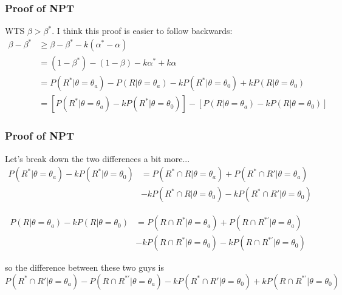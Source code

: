\documentclass{beamer}
\begin{document}
\begin{frame}
\frametitle{Proof of NPT}

WTS $\beta > \beta^*$. I think this proof is easier to follow backwards:
\begin{align*}
\beta - \beta^* &\ge \beta - \beta^* - k(\alpha^* - \alpha) \\ 
&= (1-\beta^*) - (1-\beta) - k\alpha^* + k\alpha \\ 
&= P(R^*| \theta = \theta_a) - P(R| \theta = \theta_a) - kP(R^* | \theta = \theta_0) + kP(R | \theta = \theta_0) \\ 
&= \left[ P(R^*| \theta = \theta_a) - kP(R^* | \theta = \theta_0)\right] 
      - \left[P(R| \theta = \theta_a)  - kP(R | \theta = \theta_0) \right] 
\end{align*}


\end{frame}


\begin{frame}
\frametitle{Proof of NPT}

Let's break down the two differences a bit more...
\begin{align*}
 P(R^*| \theta = \theta_a) - kP(R^* | \theta = \theta_0) &=  P(R^* \cap R| \theta = \theta_a) + P(R^* \cap R'| \theta = \theta_a)\\
&- kP(R^* \cap R | \theta = \theta_0) - kP(R^* \cap R' | \theta = \theta_0)
\end{align*}


\begin{align*}
P(R| \theta = \theta_a)  - kP(R | \theta = \theta_0) &= P(R\cap R^*| \theta = \theta_a) + P(R\cap R^{*'}| \theta = \theta_a) \\
&- kP(R \cap R^* | \theta = \theta_0) - kP(R \cap R^{*'} | \theta = \theta_0)
\end{align*}

so the difference between these two guys is 
\[
P(R^* \cap R'| \theta = \theta_a) - P(R\cap R^{*'}| \theta = \theta_a) - kP(R^* \cap R' | \theta = \theta_0) + kP(R \cap R^{*'} | \theta = \theta_0)
\]

\end{frame}
\end{document}
